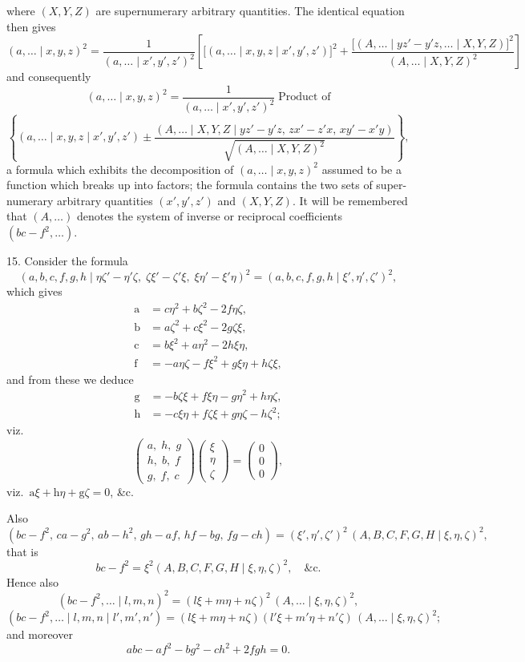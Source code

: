 \documentclass[11pt]{article}
\begin{document}
where $(X,Y,Z)$ are supernumerary arbitrary quantities. The identical equation then
gives
\[ (a,\dots \mid x,y,z)^{2}=\frac{1}{(a,\dots \mid x',y',z')^{2}}\left[\bigl[(a,\dots \mid x,y,z \mid x',y',z')\bigr]^{2}
+\frac{\bigl[(A,\dots \mid yz'-y'z,\dots \mid X,Y,Z)\bigr]^{2}}{(A,\dots \mid X,Y,Z)^{2}}\right] \]
and consequently
\[ (a,\dots \mid x,y,z)^{2}=\frac{1}{(a,\dots \mid x',y',z')^{2}}\;\text{Product of} \]
\[ \left\{(a,\dots \mid x,y,z \mid x',y',z')\pm\frac{(A,\dots \mid X,Y,Z \mid yz'-y'z,\,zx'-z'x,\,xy'-x'y)}{\sqrt{(A,\dots \mid X,Y,Z)^{2}}}\right\}, \]
a formula which exhibits the decomposition of $(a,\dots \mid x,y,z)^{2}$ assumed to be a
function which breaks up into factors; the formula contains the two sets of super-
numerary arbitrary quantities $(x',y',z')$ and $(X,Y,Z)$. It will be remembered that
$(A,\dots)$ denotes the system of inverse or reciprocal coefficients $(bc-f^{2},\dots)$.

\textsc{15.} Consider the formula
\[ (a,b,c,f,g,h \mid \eta\zeta'-\eta'\zeta,\;\zeta\xi'-\zeta'\xi,\;\xi\eta'-\xi'\eta)^{2}=(a,b,c,f,g,h \mid \xi',\eta',\zeta')^{2}, \]
which gives
\begin{align*}
\mathrm{a} &= c\eta^{2}+b\zeta^{2}-2f\eta\zeta,\\
\mathrm{b} &= a\zeta^{2}+c\xi^{2}-2g\zeta\xi,\\
\mathrm{c} &= b\xi^{2}+a\eta^{2}-2h\xi\eta,\\
\mathrm{f} &= -a\eta\zeta-f\xi^{2}+g\xi\eta+h\zeta\xi,
\end{align*}
and from these we deduce
\begin{align*}
\mathrm{g} &= -b\zeta\xi+f\xi\eta-g\eta^{2}+h\eta\zeta,\\
\mathrm{h} &= -c\xi\eta+f\zeta\xi+g\eta\zeta-h\zeta^{2};
\end{align*}
viz.
\[
\begin{pmatrix} a,\;h,\;g\\ h,\;b,\;f\\ g,\;f,\;c \end{pmatrix}
\begin{pmatrix}\xi\\ \eta\\ \zeta\end{pmatrix}=
\begin{pmatrix}0\\0\\0\end{pmatrix},
\]
viz.\ $\mathrm{a}\xi+\mathrm{h}\eta+\mathrm{g}\zeta=0$, \&c.

Also
\[ (bc-f^{2},\,ca-g^{2},\,ab-h^{2},\,gh-af,\,hf-bg,\,fg-ch)=(\xi',\eta',\zeta')^{2}\,(A,B,C,F,G,H \mid \xi,\eta,\zeta)^{2}, \]
that is
\[ bc-f^{2}=\xi^{2}(A,B,C,F,G,H \mid \xi,\eta,\zeta)^{2},\quad \&\mathrm{c}. \]
Hence also
\[ (bc-f^{2},\dots \mid l,m,n)^{2}=(l\xi+m\eta+n\zeta)^{2}\,(A,\dots \mid \xi,\eta,\zeta)^{2}, \]
\[ (bc-f^{2},\dots \mid l,m,n \mid l',m',n')=(l\xi+m\eta+n\zeta)(l'\xi+m'\eta+n'\zeta)\,(A,\dots \mid \xi,\eta,\zeta)^{2}; \]
and moreover
\[ abc-af^{2}-bg^{2}-ch^{2}+2fgh=0. \]
\end{document}
